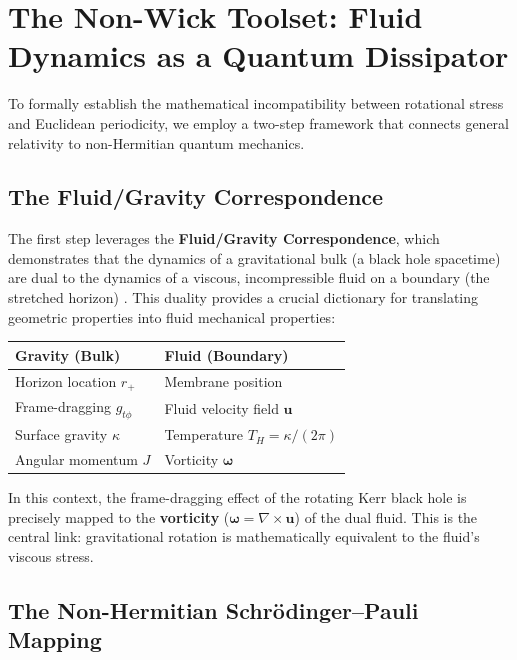 \documentclass[11pt]{article}
\begin{document}
\section{The Non-Wick Toolset: Fluid Dynamics as a Quantum Dissipator}

To formally establish the mathematical incompatibility between rotational stress and Euclidean periodicity, we employ a two-step framework that connects general relativity to non-Hermitian quantum mechanics.

\subsection{The Fluid/Gravity Correspondence\cite{FluidGravity2005}}

The first step leverages the \textbf{Fluid/Gravity Correspondence\cite{FluidGravity2005}}, which demonstrates that the dynamics of a gravitational bulk (a black hole spacetime) are dual to the dynamics of a viscous, incompressible fluid on a boundary (the stretched horizon) \cite{FluidGravity2005}. This duality provides a crucial dictionary for translating geometric properties into fluid mechanical properties:

\begin{center}
\begin{tabular}{|l|l|}
\hline
\textbf{Gravity (Bulk)} & \textbf{Fluid (Boundary)} \\
\hline
Horizon location $r_+$ & Membrane position \\
Frame-dragging $g_{t\phi}$ & Fluid velocity field $\mathbf{u}$ \\
Surface gravity $\kappa$ & Temperature $T_H = \kappa/(2\pi)$ \\
Angular momentum $J$ & Vorticity $\mathbf{\omega}$ \\
\hline
\end{tabular}
\end{center}

In this context, the frame-dragging effect of the rotating Kerr black hole \cite{Kerr1963} is precisely mapped to the \textbf{vorticity} ($\mathbf{\omega} = \nabla \times \mathbf{u}$) of the dual fluid. This is the central link: gravitational rotation is mathematically equivalent to the fluid's viscous stress.

\subsection{The Non-Hermitian Schr\"odinger--Pauli Mapping}
\end{document}

